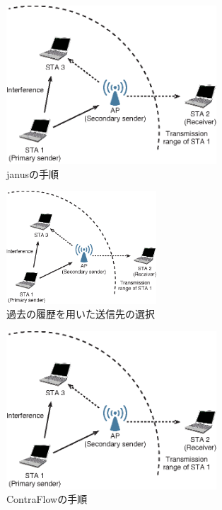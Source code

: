 \documentclass[master]{kuisthesis}		%
\begin{document}
			\begin{figure}[t]
				\begin{center}
					\includegraphics[width=0.7\textwidth]{fig/janus.eps}
					\caption{janusの手順}
					\label{fig:contra}
				\end{center}
			\end{figure}

			\begin{figure}[t]
				\begin{center}
					\includegraphics[width=0.5\textwidth]{fig/contra.eps}
					\caption{過去の履歴を用いた送信先の選択}
					\label{fig:contra}
				\end{center}
			\end{figure}

			\begin{figure}[t]
				\begin{center}
					\includegraphics[width=0.7\textwidth]{fig/contra1.eps}
					\caption{ContraFlowの手順}
					\label{fig:contra}
				\end{center}
			\end{figure}
\end{document}
